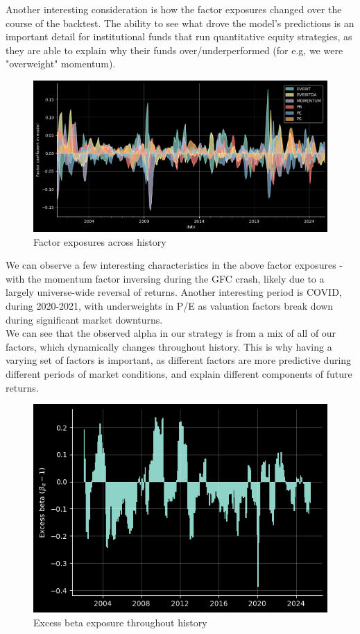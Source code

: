 \documentclass[12pt]{article}
\begin{document}
Another interesting consideration is how the factor exposures changed over the course of the backtest. 
The ability to see what drove the model's predictions is an important detail for institutional 
funds that run quantitative equity strategies, as they are able to explain why their funds 
over/underperformed (for e.g, we were "overweight" momentum).
\begin{figure}[H]
    \centering
    \includegraphics[width=16cm]{./static/factor_exposures.png}
    \caption{Factor exposures across history}
    \label{fig:factor_exposures}
\end{figure}
We can observe a few interesting characteristics in the above factor exposures - with the momentum factor 
inversing during the GFC crash, likely due to a largely universe-wide reversal of returns. Another interesting
period is COVID, during 2020-2021, with underweights in P/E as valuation factors break down during 
significant market downturns.
\newline \\ 
We can see that the observed alpha in our strategy is from a mix of all of our factors,
which dynamically changes throughout history. This is why having a varying set of factors is important,
as different factors are more predictive during different periods of market conditions, and explain 
different components of future returns.

\begin{figure}[H]
    \centering
    \includegraphics[width=13cm]{./static/beta_exposures.png}
    \caption{Excess beta exposure throughout history}
    \label{fig:beta_exposures}
\end{figure}
\end{document}
